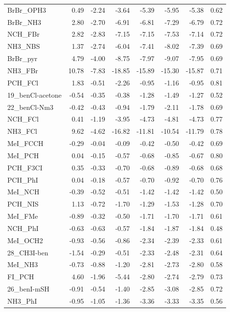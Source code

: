 {\begin{longtable}{lrrrrrrr}
BrBr\_OPH3 & 0.49 & -2.24 & -3.64 & -5.39 & -5.95 & -5.38 & 0.62\\
BrBr\_NH3 & 2.80 & -2.70 & -6.91 & -6.81 & -7.29 & -6.79 & 0.72\\
NCH\_FBr & 2.82 & -2.83 & -7.15 & -7.15 & -7.53 & -7.14 & 0.72\\
NH3\_NBS & 1.37 & -2.74 & -6.04 & -7.41 & -8.02 & -7.39 & 0.69\\
BrBr\_pyr & 4.79 & -4.00 & -8.75 & -7.97 & -9.07 & -7.95 & 0.69\\
NH3\_FBr & 10.78 & -7.83 & -18.85 & -15.89 & -15.30 & -15.87 & 0.71\\
PCH\_FCl & 1.83 & -0.51 & -2.26 & -0.95 & -1.16 & -0.95 & 0.81\\
19\_benCl-acetone & -0.54 & -0.35 & -0.38 & -1.28 & -1.49 & -1.27 & 0.52\\
22\_benCl-Nm3 & -0.42 & -0.43 & -0.94 & -1.79 & -2.11 & -1.78 & 0.69\\
NCH\_FCl & 0.41 & -1.19 & -3.95 & -4.73 & -4.81 & -4.73 & 0.77\\
NH3\_FCl & 9.62 & -4.62 & -16.82 & -11.81 & -10.54 & -11.79 & 0.78\\
MeI\_FCCH & -0.29 & -0.04 & -0.09 & -0.42 & -0.50 & -0.42 & 0.69\\
MeI\_PCH & 0.04 & -0.15 & -0.57 & -0.68 & -0.85 & -0.67 & 0.80\\
PCH\_F3CI & 0.35 & -0.33 & -0.70 & -0.68 & -0.89 & -0.68 & 0.68\\
PCH\_PhI & 0.04 & -0.18 & -0.57 & -0.70 & -0.92 & -0.70 & 0.76\\
MeI\_NCH & -0.39 & -0.52 & -0.51 & -1.42 & -1.42 & -1.42 & 0.50\\
PCH\_NIS & 1.13 & -0.72 & -1.70 & -1.29 & -1.53 & -1.28 & 0.70\\
MeI\_FMe & -0.89 & -0.32 & -0.50 & -1.71 & -1.70 & -1.71 & 0.61\\
NCH\_PhI & -0.63 & -0.63 & -0.57 & -1.84 & -1.87 & -1.84 & 0.48\\
MeI\_OCH2 & -0.93 & -0.56 & -0.86 & -2.34 & -2.39 & -2.33 & 0.61\\
28\_CH3I-ben & -1.54 & -0.29 & -0.51 & -2.33 & -2.48 & -2.31 & 0.64\\
MeI\_NH3 & -0.73 & -0.88 & -1.20 & -2.81 & -2.73 & -2.80 & 0.58\\
FI\_PCH & 4.60 & -1.96 & -5.44 & -2.80 & -2.74 & -2.79 & 0.73\\
26\_benI-mSH & -0.91 & -0.54 & -1.40 & -2.85 & -3.08 & -2.85 & 0.72\\
NH3\_PhI & -0.95 & -1.05 & -1.36 & -3.36 & -3.33 & -3.35 & 0.56\\

\end{longtable}}
